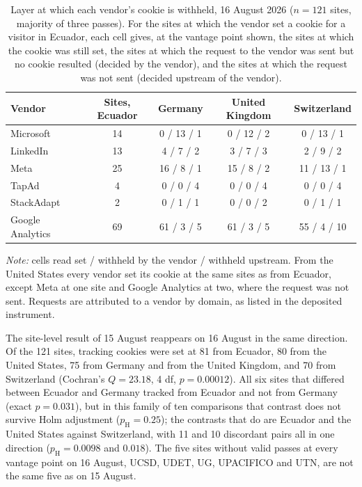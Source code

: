 \documentclass[]{interact}
\begin{document}
\begin{table}[htbp]
	\centering
	\caption{Layer at which each vendor's cookie is withheld, 16 August 2026 ($n=121$ sites, majority of three passes). For the sites at which the vendor set a cookie for a visitor in Ecuador, each cell gives, at the vantage point shown, the sites at which the cookie was still set, the sites at which the request to the vendor was sent but no cookie resulted (decided by the vendor), and the sites at which the request was not sent (decided upstream of the vendor).}\label{tab:layer}
	\small
	\begin{tabular}{@{}lcccc@{}}
		\toprule
		\textbf{Vendor} & \textbf{Sites, Ecuador} & \textbf{Germany} & \textbf{United Kingdom} & \textbf{Switzerland} \\
		\midrule
		Microsoft & 14 & 0 / 13 / 1 & 0 / 12 / 2 & 0 / 13 / 1 \\
		LinkedIn & 13 & 4 / 7 / 2 & 3 / 7 / 3 & 2 / 9 / 2 \\
		Meta & 25 & 16 / 8 / 1 & 15 / 8 / 2 & 11 / 13 / 1 \\
		TapAd & 4 & 0 / 0 / 4 & 0 / 0 / 4 & 0 / 0 / 4 \\
		StackAdapt & 2 & 0 / 1 / 1 & 0 / 0 / 2 & 0 / 1 / 1 \\
		Google Analytics & 69 & 61 / 3 / 5 & 61 / 3 / 5 & 55 / 4 / 10 \\
		\bottomrule
	\end{tabular}
	\par\vspace{3pt}
	\footnotesize\RaggedRight\textit{Note:} cells read set / withheld by the vendor / withheld upstream. From the United States every vendor set its cookie at the same sites as from Ecuador, except Meta at one site and Google Analytics at two, where the request was not sent. Requests are attributed to a vendor by domain, as listed in the deposited instrument.
\end{table}

The site-level result of 15 August reappears on 16 August in the same direction. Of the 121 sites, tracking cookies were set at 81 from Ecuador, 80 from the United States, 75 from Germany and from the United Kingdom, and 70 from Switzerland (Cochran's $Q=23.18$, 4 df, $p=0.00012$). All six sites that differed between Ecuador and Germany tracked from Ecuador and not from Germany (exact $p=0.031$), but in this family of ten comparisons that contrast does not survive Holm adjustment ($p_{\text{H}}=0.25$); the contrasts that do are Ecuador and the United States against Switzerland, with 11 and 10 discordant pairs all in one direction ($p_{\text{H}}=0.0098$ and $0.018$). The five sites without valid passes at every vantage point on 16 August, UCSD, UDET, UG, UPACIFICO and UTN, are not the same five as on 15 August.
\end{document}

